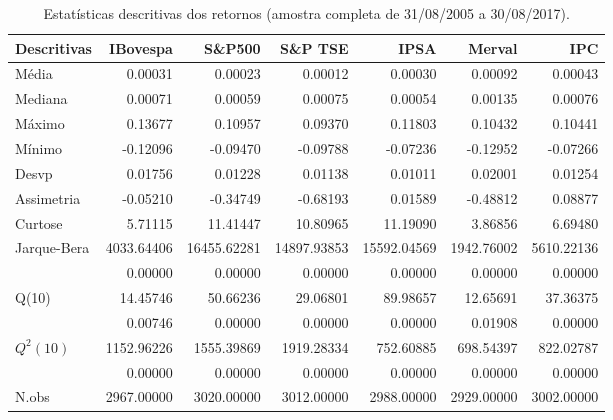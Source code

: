 \begin{table}[H]
\centering
\caption{Estatísticas descritivas dos retornos 
               (amostra completa de 31/08/2005 a 30/08/2017).} 
\label{tab:descritivas}
\begin{tabular}{lrrrrrr}
  \hline
Descritivas & IBovespa & S\&P500 & S\&P TSE & IPSA & Merval & IPC \\ 
  \hline
Média & 0.00031 & 0.00023 & 0.00012 & 0.00030 & 0.00092 & 0.00043 \\ 
  Mediana & 0.00071 & 0.00059 & 0.00075 & 0.00054 & 0.00135 & 0.00076 \\ 
  Máximo & 0.13677 & 0.10957 & 0.09370 & 0.11803 & 0.10432 & 0.10441 \\ 
  Mínimo & -0.12096 & -0.09470 & -0.09788 & -0.07236 & -0.12952 & -0.07266 \\ 
  Desvp & 0.01756 & 0.01228 & 0.01138 & 0.01011 & 0.02001 & 0.01254 \\ 
  Assimetria & -0.05210 & -0.34749 & -0.68193 & 0.01589 & -0.48812 & 0.08877 \\ 
  Curtose & 5.71115 & 11.41447 & 10.80965 & 11.19090 & 3.86856 & 6.69480 \\ 
  Jarque-Bera & 4033.64406 & 16455.62281 & 14897.93853 & 15592.04569 & 1942.76002 & 5610.22136 \\ 
   & 0.00000 & 0.00000 & 0.00000 & 0.00000 & 0.00000 & 0.00000 \\ 
  Q(10) & 14.45746 & 50.66236 & 29.06801 & 89.98657 & 12.65691 & 37.36375 \\ 
   & 0.00746 & 0.00000 & 0.00000 & 0.00000 & 0.01908 & 0.00000 \\ 
  $Q^2(10)$ & 1152.96226 & 1555.39869 & 1919.28334 & 752.60885 & 698.54397 & 822.02787 \\ 
   & 0.00000 & 0.00000 & 0.00000 & 0.00000 & 0.00000 & 0.00000 \\ 
  N.obs & 2967.00000 & 3020.00000 & 3012.00000 & 2988.00000 & 2929.00000 & 3002.00000 \\ 
   \hline
\end{tabular}
\end{table}
